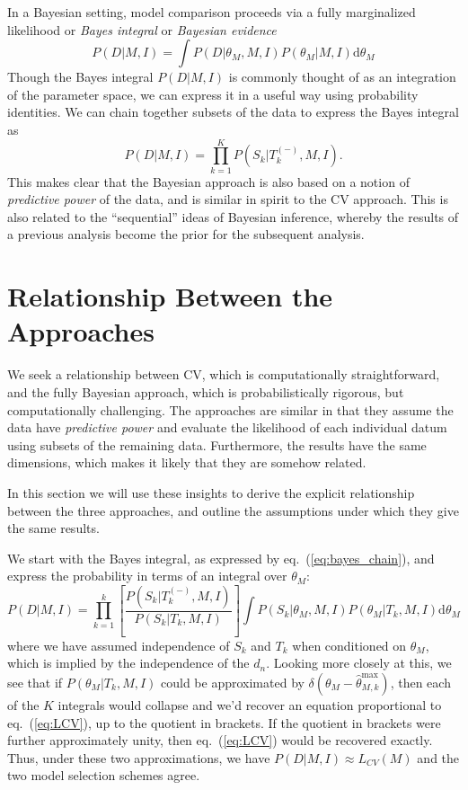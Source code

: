 \documentclass[12pt]{article}
\newcommand{\dd}{\mathrm{d}}
\newcommand{\thetamax}[1]{\ensuremath{\hat{\theta}^{\max}_{#1}}}
\newcommand{\LCV}[1]{\ensuremath{L_{CV}}(#1)}
\newcommand{\Tkminus}{\ensuremath{T_k^{(-)}}}
\newcommand{\eqn}[1]{eq.~(\ref{eq:#1})}
\begin{document}
In a Bayesian setting, model comparison proceeds via a fully marginalized
likelihood or {\it Bayes integral} or {\it Bayesian evidence}
\begin{equation}
  P(D|M,I) = \int P(D|\theta_M,M,I) P(\theta_M|M,I)\dd\theta_M
\end{equation}
Though the Bayes integral $P(D|M,I)$ is commonly thought of as an
integration of the parameter space, we can express it in a useful way
using probability identities.  We can chain together subsets of the
data to express the Bayes integral as
\begin{equation}
  \label{eq:bayes_chain}
  P(D|M,I) = \prod_{k=1}^K P(S_k|\Tkminus,M,I).
\end{equation}
This makes clear that the Bayesian approach is also based on a notion of
{\it predictive power} of the data, and is similar in spirit to
the CV approach.  This is also related to the ``sequential'' ideas
of Bayesian inference, whereby the results of a previous analysis become
the prior for the subsequent analysis.

\section{Relationship Between the Approaches}
We seek a relationship between CV, which is computationally straightforward,
and the fully Bayesian approach, which is probabilistically rigorous, but
computationally challenging.  The approaches are similar in that they assume
the data have {\it predictive power} and evaluate the likelihood of each
individual datum using subsets of the remaining data.  Furthermore, the
results have the same dimensions, which makes it likely that they are
somehow related.

In this section we will use these insights to derive the explicit
relationship between the three approaches, and outline the assumptions
under which they give the same results.

We start with the Bayes integral, as expressed by \eqn{bayes_chain},
and express the probability in terms of an integral over $\theta_M$:
\begin{equation}
  \label{eq:full_approximation}
  P(D|M, I) = \prod_{k=1}^k
  \left[\frac{P(S_k|\Tkminus,M,I)}
    {P(S_k|T_k,M,I)}
  \right]
  \int P(S_k|\theta_M,M,I) P(\theta_M|T_k,M,I) \dd\theta_M
\end{equation}
where we have assumed independence of $S_k$ and $T_k$ when conditioned
on $\theta_M$, which is implied by the independence of the  $d_n$.
Looking more closely at this, we see that if $P(\theta_M|T_k,M,I)$
could be approximated by $\delta(\theta_M - \thetamax{M,k})$,
then each of the $K$ integrals would collapse and we'd recover an
equation proportional to \eqn{LCV}, up to the quotient in brackets.
If the quotient in brackets were further approximately unity, then
\eqn{LCV} would be recovered exactly.  Thus, under these two
approximations, we have $P(D|M,I) \approx \LCV{M}$ and the two
model selection schemes agree.
\end{document}
